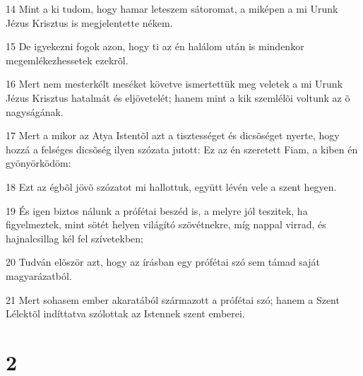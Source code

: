 \par 14 Mint a ki tudom, hogy hamar leteszem sátoromat, a miképen a mi Urunk Jézus Krisztus is megjelentette nékem.
\par 15 De igyekezni fogok azon, hogy ti az én halálom után is mindenkor megemlékezhessetek ezekrõl.
\par 16 Mert nem mesterkélt meséket követve ismertettük meg veletek a mi Urunk Jézus Krisztus hatalmát és eljövetelét; hanem mint a kik szemlélõi voltunk az  õ nagyságának.
\par 17 Mert a mikor az Atya Istentõl azt a tisztességet és dicsõséget nyerte, hogy hozzá a felséges dicsõség ilyen szózata jutott: Ez az én szeretett Fiam, a kiben én gyönyörködöm:
\par 18 Ezt az égbõl jövõ szózatot mi hallottuk, együtt lévén vele a szent hegyen.
\par 19 És igen biztos nálunk a prófétai beszéd is, a melyre jól teszitek, ha figyelmeztek, mint sötét  helyen világító szövétnekre, míg nappal virrad, és hajnalcsillag kél fel szívetekben;
\par 20 Tudván elõször azt, hogy az írásban egy prófétai szó sem támad saját magyarázatból.
\par 21 Mert sohasem ember akaratából származott a prófétai szó; hanem a Szent Lélektõl indíttatva szólottak az Istennek szent emberei.

\chapter{2}


